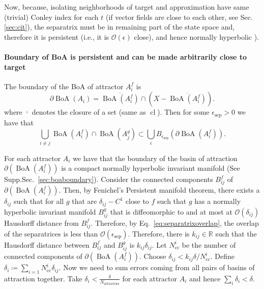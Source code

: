 \documentclass{article}
\theoremstyle{definition}
\theoremstyle{remark}
\newcommand{\reals}{\mathbb{R}}
\newcommand{\cl}{\operatorname{cl}}
\newcommand{\boa}{\operatorname{BoA}}
\newcounter{ct}
\begin{document}
 Now, because, isolating neighborhoods of target and approximation have same (trivial) Conley index  for each $t$ (if vector fields are close to each other, see Sec.\ref{sec:cit}),
the separatrix must be in remaining part of the state space and, therefore it is persistent (i.e., it is $\mathcal{O}(\epsilon)$ close), and hence normally hyperbolic \citep{mane1978persistent}).


\paragraph{Boundary of BoA is persistent and can be made arbitrarily close to target}%
The boundary of the BoA of attractor $A_i^f$ is %
\[\partial\boa(A_i) = \overline{\boa(A_i^f)} \cap (X - \overline{\boa(A_i^f)}).\]
where \(\overline{\cdot}\) denotes the closure of a set (same as \(\cl\)).
%
Then for some  $\epsilon_{\operatorname{sep}}>0$ we have that 
\begin{equation}\label{eq:separatrixoverlap}
\bigcup_{i\neq j} \boa(A_i^f)\cap\boa(A_j^g) \subset \bigcup_i B_{\epsilon_{\operatorname{sep}}}(\partial\boa(A_i^f)). 
\end{equation}



For each attractor $A_i$ we have that the boundary of the basin of attraction $\partial(\boa(A_i^f))$ is a compact normally hyperbolic invariant manifold (See Supp.Sec.~\ref{sec:boaboundary}).
Consider the connected components $B^f_{ij}$ of $\partial(\boa(A_i^f))$. %
Then, by Fenichel's Persistent manifold theorem, there exists a $\delta_{ij}$ such that for all $g$ that are $\delta_{ij}-C^1$ close to $f$ such that $g$ has a normally hyperbolic invariant manifold  $B^g_{ij}$ that is diffeomorphic to and at most at $\mathcal{O}(\delta_{ij})$ Hausdorff distance from $B^f_{ij}$.
Therefore, by Eq.~\ref{eq:separatrixoverlap}, the overlap of the separatrices is less than $\mathcal{O}(\epsilon_{\operatorname{sep}})$. %
Therefore, there is $k_{ij}\in\reals$ such that the Hausdorff distance between $B^f_{ij}$ and $B^g_{ij}$ is $k_{ij}\delta_{ij}$.
Let  $N_{\operatorname{cc}}^i$ be the number of connected components of $\partial(\boa(A_i^f))$.
Choose $\delta_{ij}<k_{ij}\delta/N_{\operatorname{cc}}^i$. 
Define $\delta_i\coloneqq\sum_{i=1}{N_{\operatorname{cc}}^i}\delta_{ij}$.
Now we need to sum errors coming from all pairs of basins of attraction together.
Take $\delta_i< \frac{\delta}{N_{\operatorname{attractors}}}$ for each attractor $A_i$ and hence $\sum_i\delta_i<\delta$.
\end{document}

